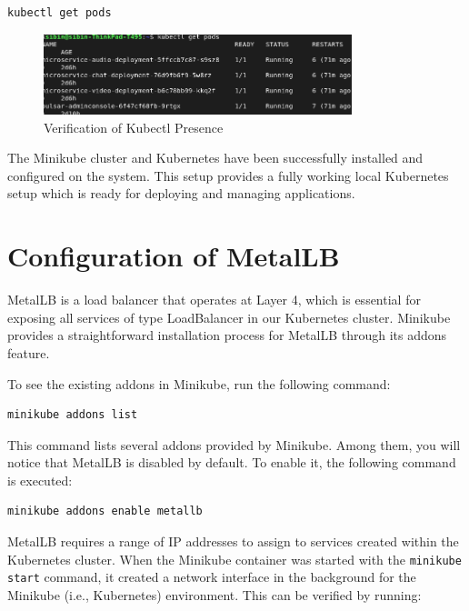 \begin{lstlisting}[breaklines=true,basicstyle=\small\ttfamily,frame=single]
kubectl get pods
\end{lstlisting}

\begin{figure}[h!]
    \centering
    \includegraphics[width=0.8\textwidth]{implementation/pods.png}
    \caption{Verification of Kubectl Presence}
    \label{fig:kgetpods}
\end{figure}

The Minikube cluster and Kubernetes have been successfully installed and configured on the system. This setup provides a fully working local Kubernetes setup which is ready for deploying and managing applications.

\section{Configuration of MetalLB}
MetalLB is a load balancer that operates at Layer 4, which is essential for exposing all services of type LoadBalancer in our Kubernetes cluster. Minikube provides a straightforward installation process for MetalLB through its addons feature.

To see the existing addons in Minikube, run the following command:

\begin{lstlisting}[breaklines=true,basicstyle=\small\ttfamily,frame=single]
minikube addons list
\end{lstlisting}

This command lists several addons provided by Minikube. Among them, you will notice that MetalLB is disabled by default. To enable it, the following command is executed:

\begin{lstlisting}[breaklines=true,basicstyle=\small\ttfamily,frame=single]
minikube addons enable metallb
\end{lstlisting}

MetalLB requires a range of IP addresses to assign to services created within the Kubernetes cluster. When the Minikube container was started with the \texttt{minikube start} command, it created a network interface in the background for the Minikube (i.e., Kubernetes) environment. This can be verified by running:

